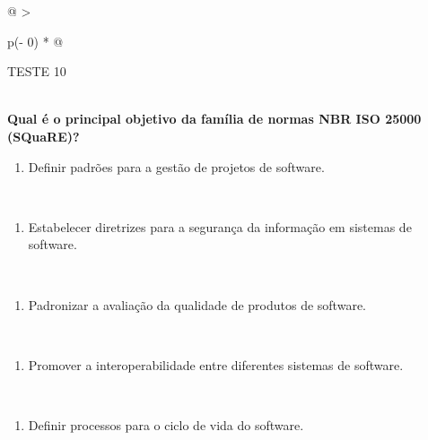 \documentclass[
]{book}
\providecommand{\tightlist}{%
  \setlength{\itemsep}{0pt}\setlength{\parskip}{0pt}}
\begin{document}
\begin{longtable}[]{@{}
  >{\raggedright\arraybackslash}p{(\columnwidth - 0\tabcolsep) * }@{}}
\toprule\noalign{}
\begin{minipage}[b]{\linewidth}\raggedright
TESTE 10
\end{minipage} \\
\midrule\noalign{}
\endhead
\bottomrule\noalign{}
\endlastfoot
\textbf{Qual é o principal objetivo da família de normas NBR ISO 25000 (SQuaRE)?} \\
\begin{minipage}[t]{\linewidth}\raggedright
\begin{enumerate}
\def\labelenumi{\alph{enumi})}
\tightlist
\item
  Definir padrões para a gestão de projetos de software.
\end{enumerate}
\end{minipage} \\
\begin{minipage}[t]{\linewidth}\raggedright
\begin{enumerate}
\def\labelenumi{\alph{enumi})}
\setcounter{enumi}{1}
\tightlist
\item
  Estabelecer diretrizes para a segurança da informação em sistemas de software.
\end{enumerate}
\end{minipage} \\
\begin{minipage}[t]{\linewidth}\raggedright
\begin{enumerate}
\def\labelenumi{\alph{enumi})}
\setcounter{enumi}{2}
\tightlist
\item
  Padronizar a avaliação da qualidade de produtos de software.
\end{enumerate}
\end{minipage} \\
\begin{minipage}[t]{\linewidth}\raggedright
\begin{enumerate}
\def\labelenumi{\alph{enumi})}
\setcounter{enumi}{3}
\tightlist
\item
  Promover a interoperabilidade entre diferentes sistemas de software.
\end{enumerate}
\end{minipage} \\
\begin{minipage}[t]{\linewidth}\raggedright
\begin{enumerate}
\def\labelenumi{\alph{enumi})}
\setcounter{enumi}{4}
\tightlist
\item
  Definir processos para o ciclo de vida do software.
\end{enumerate}
\end{minipage} \\
\end{longtable}
\end{document}

